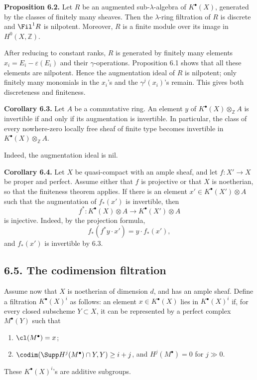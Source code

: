 \textbf{Proposition 6.2.} Let \(R\) be an augmented sub-\(\lambda\)-algebra of \(K^\bullet(X)\), generated by the classes of finitely many sheaves. Then the \(\lambda\)-ring filtration of \(R\) is discrete and \(\Fil^1R\) is nilpotent. Moreover, \(R\) is a finite module over its image in \(H^0(X,\mathbb Z)\).

After reducing to constant ranks, \(R\) is generated by finitely many elements \(x_i=E_i-\varepsilon(E_i)\) and their \(\gamma\)-operations. Proposition 6.1 shows that all these elements are nilpotent. Hence the augmentation ideal of \(R\) is nilpotent; only finitely many monomials in the \(x_i\)'s and the \(\gamma^j(x_i)\)'s remain. This gives both discreteness and finiteness.

\textbf{Corollary 6.3.} Let \(A\) be a commutative ring. An element \(y\) of \(K^\bullet(X)\otimes_{\mathbb Z}A\) is invertible if and only if its augmentation is invertible. In particular, the class of every nowhere-zero locally free sheaf of finite type becomes invertible in \(K^\bullet(X)\otimes_{\mathbb Z}A\).

Indeed, the augmentation ideal is nil.

\textbf{Corollary 6.4.} Let \(X\) be quasi-compact with an ample sheaf, and let \(f:X'\to X\) be proper and perfect. Assume either that \(f\) is projective or that \(X\) is noetherian, so that the finiteness theorem applies. If there is an element \(x'\in K^\bullet(X')\otimes A\) such that the augmentation of \(f_*(x')\) is invertible, then
\[
  f^*:K^\bullet(X)\otimes A\longrightarrow K^\bullet(X')\otimes A
\]
is injective.
Indeed, by the projection formula,
\[
  f_*(f^*y\cdot x')=y\cdot f_*(x'),
\]
and \(f_*(x')\) is invertible by 6.3.

\subsection*{6.5. The codimension filtration}
Assume now that \(X\) is noetherian of dimension \(d\), and has an ample sheaf. Define a filtration \(K^\bullet(X)^i\) as follows: an element \(x\in K^\bullet(X)\) lies in \(K^\bullet(X)^i\) if, for every closed subscheme \(Y\subset X\), it can be represented by a perfect complex \(M^\bullet(Y)\) such that
\begin{enumerate}[label=\textup{\alph*)}]
\item \(\cl(M^\bullet)=x\);
\item \(\codim(\Supp H^j(M^\bullet)\cap Y,Y)\geq i+j\), and \(H^j(M^\bullet)=0\) for \(j\gg 0\).
\end{enumerate}
These \(K^\bullet(X)^i\)'s are additive subgroups.

